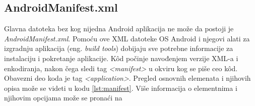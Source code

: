 \documentclass[android.tex]{subfiles}
\begin{document}
\subsection{AndroidManifest.xml}
\label{sec:manifest}
Glavna datoteka bez kog nijedna Android aplikacija ne može da postoji je \textit{AndroidManifest.xml}. Pomoću ove XML datoteke OS Android i njegovi alati za izgradnju aplikacija (eng. \textit{build tools}) dobijaju sve potrebne informacije za instalaciju i pokretanje aplikacije. K\^{o}d počinje navođenjem verzije XML-a i enkodiranja, nakon čega sledi tag \textit{<manifest> }u okviru kog se piše ceo k\^{o}d. Obavezni deo koda je tag \textit{<application>}. Pregled osnovnih elemenata i njihovih opisa može se videti u kodu \ref{lst:manifest}. Više informacija o elementnima i njihovim opcijama može se pronaći na \cite{sajt:manifest}


\end{document}
